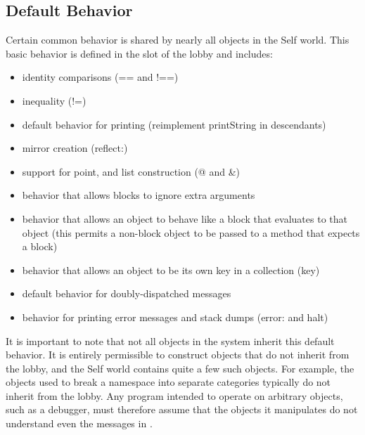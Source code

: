\documentclass[letterpaper,10pt,english]{sphinxmanual}
\begin{document}
\subsection{Default Behavior}
\label{roots:default-behavior}
Certain common behavior is shared by nearly all objects in the Self world. This basic behavior is
defined in the  slot of the lobby and includes:
\begin{itemize}
\item {} 
identity comparisons (== and !==)

\item {} 
inequality (!=)

\item {} 
default behavior for printing (reimplement printString in descendants)

\item {} 
mirror creation (reflect:)

\item {} 
support for point, and list construction (@ and \&)

\item {} 
behavior that allows blocks to ignore extra arguments

\item {} 
behavior that allows an object to behave like a block that evaluates to that object (this permits a non-block object to be passed to a method that expects a block)

\item {} 
behavior that allows an object to be its own key in a collection (key)

\item {} 
default behavior for doubly-dispatched messages

\item {} 
behavior for printing error messages and stack dumps (error: and halt)

\end{itemize}

It is important to note that not all objects in the system inherit this default behavior. It is entirely
permissible to construct objects that do not inherit from the lobby, and the Self world contains
quite a few such objects. For example, the objects used to break a namespace into separate categories
typically do not inherit from the lobby. Any program intended to operate on arbitrary objects,
such as a debugger, must therefore assume that the objects it manipulates do not understand even
the messages in .
\end{document}
